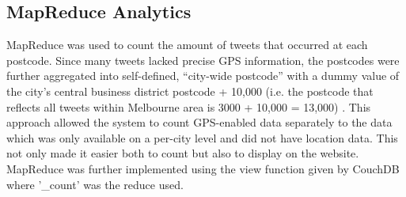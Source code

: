 \documentclass[11pt, oneside]{article}
\begin{document}
\subsection{MapReduce Analytics}
\label{sec:mapreduce_analytics}
MapReduce was used to count the amount of tweets that occurred at each postcode. Since many tweets lacked precise GPS information, the postcodes were further aggregated into self-defined, \enquote{city-wide postcode} with a dummy value of the city's central business district postcode + 10,000 (i.e. the postcode that reflects all tweets within Melbourne area is 3000 + 10,000 = 13,000) . 
\newline 
This approach allowed the system to count GPS-enabled data separately to the data which was only available on a per-city level and did not have location data. This not only made it easier both to count but also to display on the website. 
\newline
MapReduce was further implemented using the view function given by CouchDB where '\_count' was the reduce used.
\end{document}
